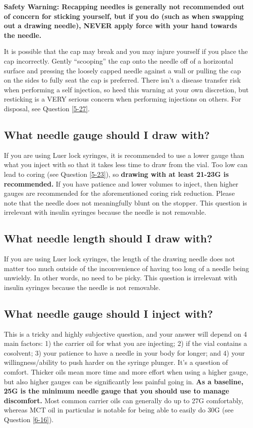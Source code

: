 \documentclass{article}
\begin{document}
\textbf{Safety Warning: Recapping needles is generally not recommended out of concern for sticking yourself, but if you do (such as when swapping out a drawing needle), NEVER apply force with your hand towards the needle.}

It is possible that the cap may break and you may injure yourself if you place the cap incorrectly. Gently “scooping” the cap onto the needle off of a horizontal surface and pressing the loosely capped needle against a wall or pulling the cap on the sides to fully seat the cap is preferred. There isn't a disease transfer risk when performing a self injection, so heed this warning at your own discretion, but resticking is a VERY serious concern when performing injections on others. For disposal, see Question \ref{5-27}.

\subsection{What needle gauge should I draw with?}

If you are using Luer lock syringes, it is recommended to use a lower gauge than what you inject with so that it takes less time to draw from the vial. Too low can lead to coring (see Question \ref{5-23}), so \textbf{drawing with at least 21-23G is recommended.} If you have patience and lower volumes to inject, then higher gauges are recommended for the aforementioned coring risk reduction. Please note that the needle does not meaningfully blunt on the stopper. This question is irrelevant with insulin syringes because the needle is not removable.

\subsection{What needle length should I draw with?}

If you are using Luer lock syringes, the length of the drawing needle does not matter too much outside of the inconvenience of having too long of a needle being unwieldy. In other words, no need to be picky. This question is irrelevant with insulin syringes because the needle is not removable.

\subsection{What needle gauge should I inject with?}\label{5-16}

This is a tricky and highly subjective question, and your answer will depend on 4 main factors: 1) the carrier oil for what you are injecting; 2) if the vial contains a cosolvent; 3) your patience to have a needle in your body for longer; and 4) your willingness/ability to push harder on the syringe plunger. It’s a question of comfort. Thicker oils mean more time and more effort when using a higher gauge, but also higher gauges can be significantly less painful going in. \textbf{As a baseline, 25G is the minimum needle gauge that you should use to manage discomfort.} Most common carrier oils can generally do up to 27G comfortably, whereas MCT oil in particular is notable for being able to easily do 30G (see Question \ref{6-16}).
\end{document}
